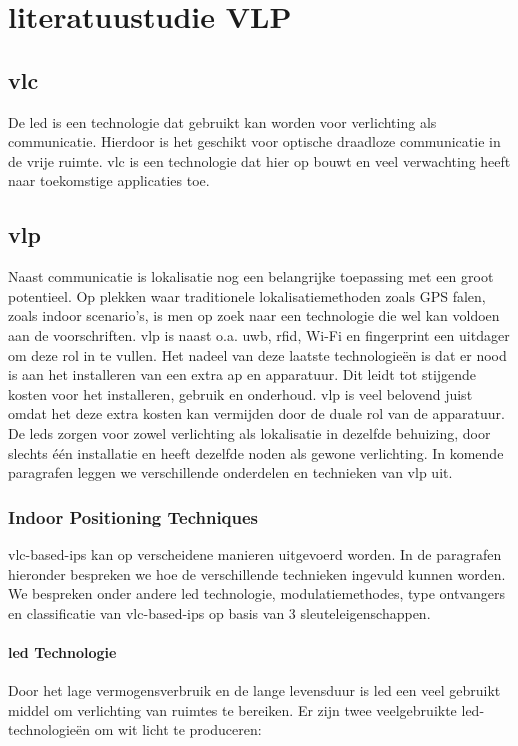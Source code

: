 \chapter{literatuustudie VLP}
\section{\acrfull{vlc}}
De \acrfull{led} is een technologie dat gebruikt kan worden voor verlichting als communicatie. Hierdoor is het geschikt voor optische draadloze communicatie in de vrije ruimte. \gls{vlc} is een technologie dat hier op bouwt en veel verwachting heeft naar toekomstige applicaties toe. 
\section{\acrfull{vlp}}
Naast communicatie is lokalisatie nog een belangrijke toepassing met een groot potentieel. Op plekken waar traditionele lokalisatiemethoden zoals GPS falen, zoals indoor scenario's, is men op zoek naar een technologie die wel kan voldoen aan de voorschriften. \acrfull{vlp} is naast o.a. \acrfull{uwb}, \acrfull{rfid}, Wi-Fi en fingerprint een uitdager om deze rol in te vullen. Het nadeel van deze laatste technologie\"en is dat er nood is aan het installeren van een extra \acrfull{ap} en apparatuur. Dit leidt tot stijgende kosten voor het installeren, gebruik en onderhoud.
\gls{vlp} is veel belovend juist omdat het deze extra kosten kan vermijden door de duale rol van de apparatuur. De \glspl{led} zorgen voor zowel verlichting als lokalisatie in dezelfde behuizing, door slechts één installatie en heeft dezelfde noden als gewone verlichting. In komende paragrafen leggen we verschillende onderdelen en technieken van \gls{vlp} uit.
\subsection{Indoor Positioning Techniques}
\gls{vlc}-based-\gls{ips} kan op verscheidene manieren uitgevoerd worden. In de paragrafen hieronder bespreken we hoe de verschillende technieken ingevuld kunnen worden. We bespreken onder andere \gls{led} technologie, modulatiemethodes, type ontvangers en classificatie van \gls{vlc}-based-\gls{ips} op basis van 3 sleuteleigenschappen.

\subsubsection{\gls{led} Technologie}
Door het lage vermogensverbruik en de lange levensduur is \gls{led} een veel gebruikt middel om verlichting van ruimtes te bereiken. Er zijn twee veelgebruikte \gls{led}-technologie\"en om wit licht te produceren: 

